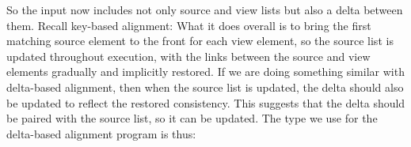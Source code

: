 So the input now includes not only source and view lists but also a delta between them.
Recall key-based alignment: What it does overall is to bring the first matching source element to the front for each view element, so the source list is updated throughout execution, with the links between the source and view elements gradually and implicitly restored.
If we are doing something similar with delta-based alignment, then when the source list is updated, the delta should also be updated to reflect the restored consistency.
This suggests that the delta should be paired with the source list, so it can be updated.
The type we use for the delta-based alignment program is thus:
\resethooks

